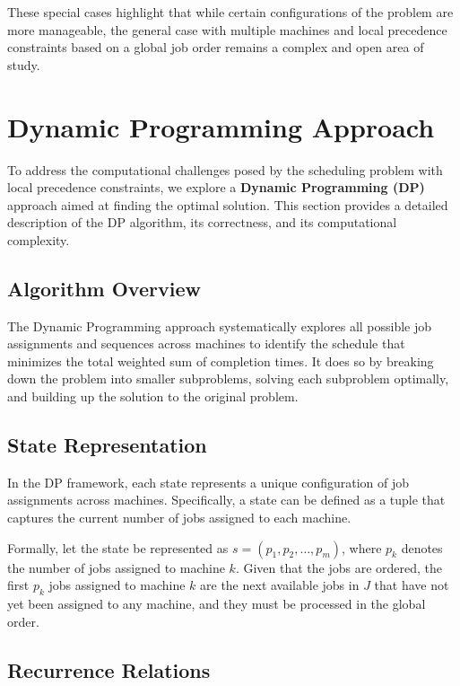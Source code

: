 These special cases highlight that while certain configurations of the problem are more manageable, the general case with multiple machines and local precedence constraints based on a global job order remains a complex and open area of study.


\section{Dynamic Programming Approach}

To address the computational challenges posed by the scheduling problem with local precedence constraints, we explore a \textbf{Dynamic Programming (DP)} approach aimed at finding the optimal solution. This section provides a detailed description of the DP algorithm, its correctness, and its computational complexity.

\subsection{Algorithm Overview}

The Dynamic Programming approach systematically explores all possible job assignments and sequences across machines to identify the schedule that minimizes the total weighted sum of completion times. It does so by breaking down the problem into smaller subproblems, solving each subproblem optimally, and building up the solution to the original problem.

\subsection{State Representation}

In the DP framework, each state represents a unique configuration of job assignments across machines. Specifically, a state can be defined as a tuple that captures the current number of jobs assigned to each machine.

Formally, let the state be represented as $s = (p_1, p_2, \dots, p_m)$, where $p_k$ denotes the number of jobs assigned to machine $k$. Given that the jobs are ordered, the first $p_k$ jobs assigned to machine $k$ are the next available jobs in $J$ that have not yet been assigned to any machine, and they must be processed in the global order.

\subsection{Recurrence Relations}

